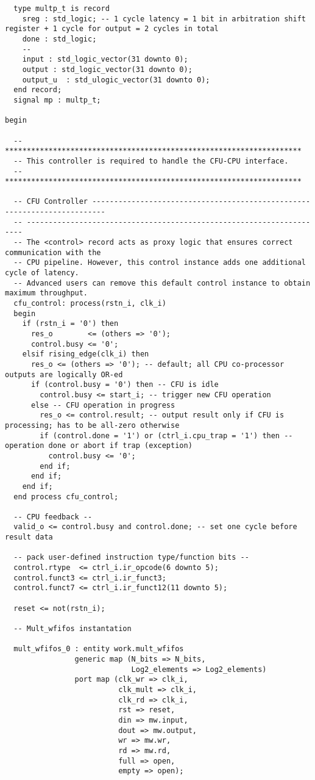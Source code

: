 \begin{code}
\begin{verbatim}
  type multp_t is record
    sreg : std_logic; -- 1 cycle latency = 1 bit in arbitration shift register + 1 cycle for output = 2 cycles in total
    done : std_logic;
    --
    input : std_logic_vector(31 downto 0);
    output : std_logic_vector(31 downto 0);
    output_u  : std_ulogic_vector(31 downto 0);
  end record;
  signal mp : multp_t;

begin

  -- ********************************************************************
  -- This controller is required to handle the CFU-CPU interface.
  -- ********************************************************************

  -- CFU Controller -------------------------------------------------------------------------
  -- ---------------------------------------------------------------------
  -- The <control> record acts as proxy logic that ensures correct communication with the
  -- CPU pipeline. However, this control instance adds one additional cycle of latency.
  -- Advanced users can remove this default control instance to obtain maximum throughput.
  cfu_control: process(rstn_i, clk_i)
  begin
    if (rstn_i = '0') then
      res_o        <= (others => '0');
      control.busy <= '0';
    elsif rising_edge(clk_i) then
      res_o <= (others => '0'); -- default; all CPU co-processor outputs are logically OR-ed
      if (control.busy = '0') then -- CFU is idle
        control.busy <= start_i; -- trigger new CFU operation
      else -- CFU operation in progress
        res_o <= control.result; -- output result only if CFU is processing; has to be all-zero otherwise
        if (control.done = '1') or (ctrl_i.cpu_trap = '1') then -- operation done or abort if trap (exception)
          control.busy <= '0';
        end if;
      end if;
    end if;
  end process cfu_control;

  -- CPU feedback --
  valid_o <= control.busy and control.done; -- set one cycle before result data

  -- pack user-defined instruction type/function bits --
  control.rtype  <= ctrl_i.ir_opcode(6 downto 5);
  control.funct3 <= ctrl_i.ir_funct3;
  control.funct7 <= ctrl_i.ir_funct12(11 downto 5);

  reset <= not(rstn_i);

  -- Mult_wfifos instantation

  mult_wfifos_0 : entity work.mult_wfifos
                generic map (N_bits => N_bits,
                             Log2_elements => Log2_elements)
                port map (clk_wr => clk_i,
                          clk_mult => clk_i,
                          clk_rd => clk_i,
                          rst => reset,
                          din => mw.input,
                          dout => mw.output,
                          wr => mw.wr,
                          rd => mw.rd,
                          full => open,
                          empty => open);


\end{verbatim}
\end{code}
